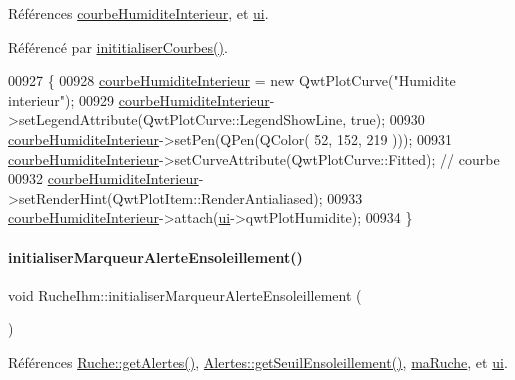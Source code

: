 Références \hyperlink{class_ruche_ihm_a19a58f5841dc91eb7f84acd419f35678}{courbe\+Humidite\+Interieur}, et \hyperlink{class_ruche_ihm_a64786058bd7f88ca2f1e9743bb27c25b}{ui}.



Référencé par \hyperlink{class_ruche_ihm_a4fe15b22538611ad9ffc4d807f8b78fd}{inititialiser\+Courbes()}.


\begin{DoxyCode}
00927 \{
00928     \hyperlink{class_ruche_ihm_a19a58f5841dc91eb7f84acd419f35678}{courbeHumiditeInterieur} = \textcolor{keyword}{new} QwtPlotCurve(\textcolor{stringliteral}{"Humidite interieur"});
00929     \hyperlink{class_ruche_ihm_a19a58f5841dc91eb7f84acd419f35678}{courbeHumiditeInterieur}->setLegendAttribute(QwtPlotCurve::LegendShowLine, \textcolor{keyword}{true});
00930     \hyperlink{class_ruche_ihm_a19a58f5841dc91eb7f84acd419f35678}{courbeHumiditeInterieur}->setPen(QPen(QColor( 52, 152, 219 )));
00931     \hyperlink{class_ruche_ihm_a19a58f5841dc91eb7f84acd419f35678}{courbeHumiditeInterieur}->setCurveAttribute(QwtPlotCurve::Fitted); \textcolor{comment}{// courbe}
00932     \hyperlink{class_ruche_ihm_a19a58f5841dc91eb7f84acd419f35678}{courbeHumiditeInterieur}->setRenderHint(QwtPlotItem::RenderAntialiased);
00933     \hyperlink{class_ruche_ihm_a19a58f5841dc91eb7f84acd419f35678}{courbeHumiditeInterieur}->attach(\hyperlink{class_ruche_ihm_a64786058bd7f88ca2f1e9743bb27c25b}{ui}->qwtPlotHumidite);
00934 \}
\end{DoxyCode}
\mbox{\label{class_ruche_ihm_a6d52dd904573d1bfc9551421ab53e8cc}} 
\paragraph{\texorpdfstring{initialiser\+Marqueur\+Alerte\+Ensoleillement()}{initialiserMarqueurAlerteEnsoleillement()}}
{\footnotesize\ttfamily void Ruche\+Ihm\+::initialiser\+Marqueur\+Alerte\+Ensoleillement (\begin{DoxyParamCaption}{ }\end{DoxyParamCaption})\hspace{0.3cm}{\ttfamily [private]}}



Références \hyperlink{class_ruche_a9edbc2e81ccb2cb76de43639bcb16ec1}{Ruche\+::get\+Alertes()}, \hyperlink{class_alertes_a54900058557979664d25137399ae2512}{Alertes\+::get\+Seuil\+Ensoleillement()}, \hyperlink{class_ruche_ihm_a43a6b1fa31f4fba58d919daae3707b38}{ma\+Ruche}, et \hyperlink{class_ruche_ihm_a64786058bd7f88ca2f1e9743bb27c25b}{ui}.



